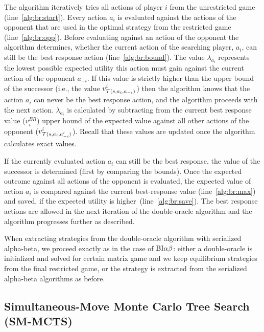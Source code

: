 The algorithm iteratively tries all actions of player $i$ from the unrestricted game (line~\ref{alg:br:start}). 
Every action $a_i$ is evaluated against the actions of the opponent that are used in the optimal strategy from the restricted game (line~\ref{alg:br:opp}).
Before evaluating against an action of the opponent the algorithm determines, whether the current action of the searching player, $a_i$, can still be the best response action (line~\ref{alg:br:bound}). 
The value $\lambda_{a_i}$ represents the lowest possible expected utility this action must gain against the current action of the opponent $a_{-i}$. 
If this value is strictly higher than the upper bound of the successor (i.e., the value $v^i_{\mathcal{T}(s,a_i,a_{-i})}$) then the algorithm knows that the action $a_i$ can never be the best response action, and the algorithm proceeds with the next action.
$\lambda_{a_i}$ is calculated by subtracting from the current best response value ($v_i^{BR}$) upper bound of the expected value against all other actions of the opponent ($v^i_{\mathcal{T}(s,a_i,a'_{-i})}$). Recall that these values are updated once the algorithm calculates exact values.

If the currently evaluated action $a_i$ can still be the best response, the value of the successor is determined (first by comparing the bounds). Once the expected outcome against all actions of the opponent is evaluated, the expected value of action $a_i$ is compared against the current best-response value (line~\ref{alg:br:max}) and saved, if the expected utility is higher~(line~\ref{alg:br:save}). The best response actions are allowed in the next iteration of the double-oracle algorithm and the algorithm progresses further as described.

When extracting strategies from the double-oracle algorithm with serialized alpha-beta, we proceed exactly as in the case of $\textrm{BI}\alpha\beta$: either a double-oracle is initialized and solved for certain matrix game and we keep equilibrium strategies from the final restricted game, or the strategy is extracted from the serialized alpha-beta algorithms as before.


\subsection{Simultaneous-Move Monte Carlo Tree Search (SM-MCTS)} \label{sec:algs:smmcts}


